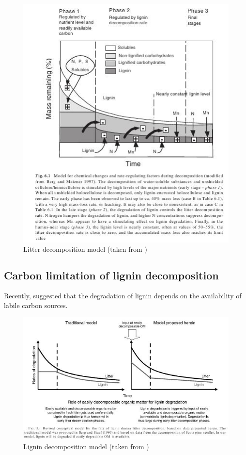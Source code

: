 \begin{figure} 
\begin{center} 
\includegraphics{decompositionmodel_berg.jpg}
\caption{Litter decomposition model (taken from \cite{Berg2008})} 
\label{fig:berg}
\end{center} 
\end{figure}  

\subsection{Carbon limitation of lignin decomposition}

Recently, \cite{Klotzbucher2011} suggested that the degradation of lignin depends on the availability of labile carbon sources. 


\begin{figure} 
\begin{center} 
\includegraphics{decompositionmodel_klotzbuecher.jpg}
\caption{Lignin decomposition model (taken from \cite{Klotzbucher2011})} 
\label{fig:klotzbuecher}
\end{center} 
\end{figure}  

